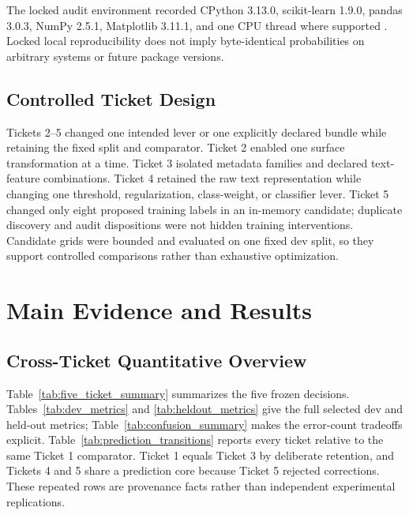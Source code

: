 \documentclass[conference]{IEEEtran}
\begin{document}


The locked audit environment recorded CPython 3.13.0, scikit-learn 1.9.0, pandas 3.0.3, NumPy 2.5.1, Matplotlib 3.11.1, and one CPU thread where supported \cite{sklearn-software,pandas-software,numpy-software,matplotlib-software}. Locked local reproducibility does not imply byte-identical probabilities on arbitrary systems or future package versions.

\subsection{Controlled Ticket Design}

Tickets 2--5 changed one intended lever or one explicitly declared bundle while retaining the fixed split and comparator. Ticket 2 enabled one surface transformation at a time. Ticket 3 isolated metadata families and declared text-feature combinations. Ticket 4 retained the raw text representation while changing one threshold, regularization, class-weight, or classifier lever. Ticket 5 changed only eight proposed training labels in an in-memory candidate; duplicate discovery and audit dispositions were not hidden training interventions. Candidate grids were bounded and evaluated on one fixed dev split, so they support controlled comparisons rather than exhaustive optimization.

\section{Main Evidence and Results}

\subsection{Cross-Ticket Quantitative Overview}

Table~\ref{tab:five_ticket_summary} summarizes the five frozen decisions. Tables~\ref{tab:dev_metrics} and \ref{tab:heldout_metrics} give the full selected dev and held-out metrics; Table~\ref{tab:confusion_summary} makes the error-count tradeoffs explicit. Table~\ref{tab:prediction_transitions} reports every ticket relative to the same Ticket 1 comparator. Ticket 1 equals Ticket 3 by deliberate retention, and Tickets 4 and 5 share a prediction core because Ticket 5 rejected corrections. These repeated rows are provenance facts rather than independent experimental replications.






\end{document}
